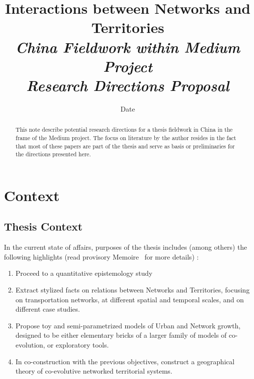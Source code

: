 


\title{Interactions between Networks and Territories\\
\textit{China Fieldwork within Medium Project}\\
\textit{Research Directions Proposal}
}
\author{}
\date{Date}


\maketitle

\justify


\begin{abstract}
This note describe potential research directions for a thesis fieldwork in China in the frame of the Medium project. The focus on literature by the author resides in the fact that most of these papers are part of the thesis and serve as basis or preliminaries for the directions presented here.
\end{abstract}



\section{Context}

\subsection{Thesis Context}

In the current state of affairs, purposes of the thesis includes (among others) the following highlights (read provisory Memoire~\cite{} for more details) :

\begin{enumerate}
\item Proceed to a quantitative epistemology study 
\item Extract stylized facts on relations between Networks and Territories, focusing on transportation networks, at different spatial and temporal scales, and on different case studies.
\item Propose toy and semi-parametrized models of Urban and Network growth, designed to be either elementary bricks of a larger family of models of co-evolution, or exploratory tools.
\item In co-construction with the previous objectives, construct a geographical theory of co-evolutive networked territorial systems.
\end{enumerate}




